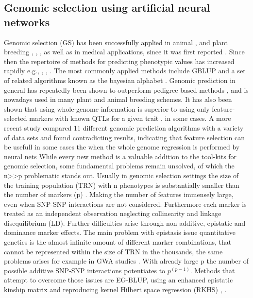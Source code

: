 \subsection{Genomic selection using artificial neural networks }
Genomic selection (GS) has been successfully applied in animal \cite{gianola2015one}, \cite{hayes2010genome}
and plant breeding \cite{crossa2010}, \cite{desta2014genomic}, \cite{heffner2010plant}, \cite{crossa2017genomic}
as well as in medical applications, since it was first reported  \cite{hayes2001}. Since then the repertoire of
methods for predicting phenotypic values has increased rapidly e.g.\cite{dlc2009}, \cite{habier2011}, \cite{gianola2013} ,
\cite{crossa2017}. The most commonly applied methods include GBLUP and a set of related algorithms known as the bayesian alphabet
\cite{gianola2009}. 
Genomic prediction in general has repeatedly been shown to outperform pedigree-based methods \cite{crossa2010},
\cite{albrecht2011} and is nowadays used in many plant and animal breeding schemes. 
It has also been shown that using whole-genome information is superior to using only feature-selected markers
with known QTLs for a given trait \cite{bernardo2007}, \cite{heffner2011} in some cases. A more recent study
\cite{azodi2019} compared 11 different genomic prediction algorithms with a variety of data sets and found
contradicting results, indicating that feature selection can be usefull in some cases the when the whole
genome regression is performed by neural nets 
While every new method is a valuable addition to the tool-kits for genomic selection, some fundamental
problems remain unsolved, of which the n>>p problematic stands out. Usually in genomic selection settings
the size of the training population (TRN) with n phenotypes is substantially smaller than the number of
markers (p) \cite{fan2014challenges}. Making the number of features immensely large,  even when SNP-SNP
interactions are not considered.  Furthermore each marker is treated as an independent observation
neglecting collinearity and linkage disequilibrium (LD). 
Further difficulties arise through non-additive, epistatic and dominance marker effects. The main problem
with epistasis issue quantitative genetics is the almost infinite amount of different marker combinations,
that cannot be represented within the size of TRN in the thousands, the same problems arises for example
in GWA studies \cite{korte2013}. With already large p the number of possible additive SNP-SNP interactions
potentiates to $p^{(p-1)}$. Methods that attempt to overcome those issues are EG-BLUP, using an enhanced
epistatic kinship matrix and reproducing kernel Hilbert space regression (RKHS) \cite{jiang2015}, \cite{martini2017genomic}.

